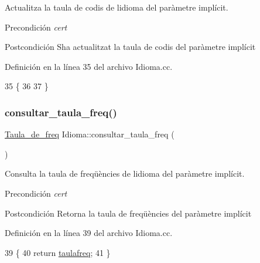 Actualitza la taula de codis de l\textquotesingle{}idioma del paràmetre implícit. 

\begin{DoxyPrecond}{Precondición}
{\itshape cert} 
\end{DoxyPrecond}
\begin{DoxyPostcond}{Postcondición}
S\textquotesingle{}ha actualitzat la taula de codis del paràmetre implícit 
\end{DoxyPostcond}


Definición en la línea 35 del archivo Idioma.\+cc.


\begin{DoxyCode}
35                                   \{
36     
37 \}
\end{DoxyCode}
\mbox{\label{class_idioma_a3d06a9d14291a5b59e0de1a65512ed80}} 
\subsubsection{\texorpdfstring{consultar\+\_\+taula\+\_\+freq()}{consultar\_taula\_freq()}}
{\footnotesize\ttfamily \hyperlink{class_taula__de__freq}{Taula\+\_\+de\+\_\+freq} Idioma\+::consultar\+\_\+taula\+\_\+freq (\begin{DoxyParamCaption}{ }\end{DoxyParamCaption})}



Consulta la taula de freqüències de l\textquotesingle{}idioma del paràmetre implícit. 

\begin{DoxyPrecond}{Precondición}
{\itshape cert} 
\end{DoxyPrecond}
\begin{DoxyPostcond}{Postcondición}
Retorna la taula de freqüències del paràmetre implícit 
\end{DoxyPostcond}


Definición en la línea 39 del archivo Idioma.\+cc.


\begin{DoxyCode}
39                                           \{
40     \textcolor{keywordflow}{return} \hyperlink{class_idioma_a51e5f7366342e04f3dae8a4f0fdcca60}{taulafreq};
41 \}
\end{DoxyCode}
\mbox{\label{class_idioma_a2c3024b18da125926668a2df2b178992}} 
